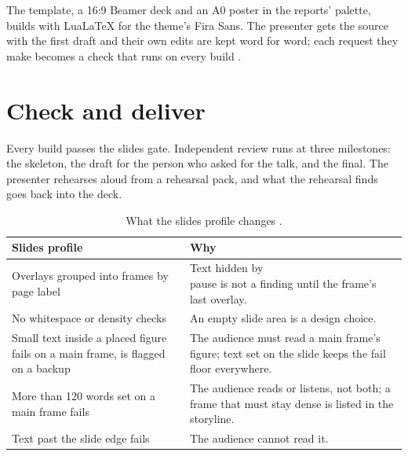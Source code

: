 The template, a 16:9 Beamer deck and an A0 poster in the reports' palette, builds with
LuaLaTeX for the theme's Fira Sans. The presenter gets the source with the first draft
and their own edits are kept word for word; each request they make becomes a check that
runs on every build \cite[The presenter's source]{skill:deck-production}.

\section{Check and deliver}

\begin{headline}
  Every build passes the slides gate. Independent review runs at three milestones: the
  skeleton, the draft for the person who asked for the talk, and the final. The presenter
  rehearses aloud from a rehearsal pack, and what the rehearsal finds goes back into the deck.
\end{headline}

\begin{table}[H]
  \small
  \begin{tabularx}{\textwidth}{L{0.3\textwidth}Y}
    \toprule
    Slides profile & Why \\
    \midrule
    Overlays grouped into frames by page label & Text hidden by \code{\\pause} is not a
    finding until the frame's last overlay. \\
    No whitespace or density checks & An empty slide area is a design choice. \\
    Small text inside a placed figure fails on a main frame, is flagged on a backup &
    The audience must read a main frame's figure; text set on the slide keeps the fail
    floor everywhere. \\
    More than 120 words set on a main frame fails & The audience reads or listens, not
    both; a frame that must stay dense is listed in the storyline. \\
    Text past the slide edge fails & The audience cannot read it. \\
    \bottomrule
  \end{tabularx}
  \caption{What the slides profile changes \cite[Slides]{skill:render-workflow}.}
  \label{tab:talks-gate}
\end{table}


